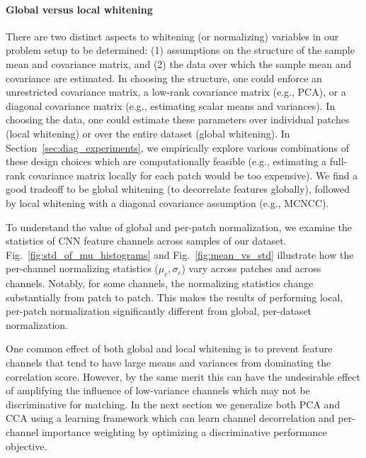 \documentclass[twocolumn]{svjour3}           %
\begin{document}
\paragraph{Global versus local whitening}
There are two distinct aspects to whitening (or normalizing) variables in our
problem setup to be determined: (1) assumptions on the structure of the sample
mean and covariance matrix, and (2) the data over which the sample mean and
covariance are estimated. In choosing the structure, one could enforce an
unrestricted covariance matrix, a low-rank covariance matrix (e.g., PCA), or a
diagonal covariance matrix (e.g., estimating scalar means and variances).  In
choosing the data, one could estimate these parameters over individual patches
(local whitening) or over the entire dataset (global whitening). In
Section~\ref{sec:diag_experiments}, we empirically explore various combinations
of these design choices which are computationally feasible (e.g., estimating a
full-rank covariance matrix locally for each patch would be too expensive).  We
find a good tradeoff to be global whitening (to decorrelate features globally),
followed by local whitening with a diagonal covariance assumption (e.g.,
MCNCC).


To understand the value of global and per-patch normalization, we examine the
statistics of CNN feature channels across samples of our dataset.
Fig.~\ref{fig:std_of_mu_histograms} and Fig.~\ref{fig:mean_vs_std} illustrate
how the per-channel normalizing statistics ($\mu_c,\sigma_c$) vary across
patches and across channels. Notably, for some channels, the normalizing
statistics change substantially from patch to patch. This makes the results of
performing local, per-patch normalization significantly different from global,
per-dataset normalization.  

One common effect of both global and local whitening is to prevent feature
channels that tend to have large means and variances from dominating the
correlation score. However, by the same merit this can have the undesirable
effect of amplifying the influence of low-variance channels which may not be
discriminative for matching.  In the next section we generalize both PCA and
CCA using a learning framework which can learn channel decorrelation and
per-channel importance weighting by optimizing a discriminative performance
objective.
\end{document}
